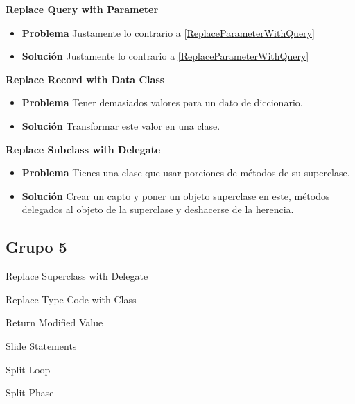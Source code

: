 \documentclass[11pt,a4paper,oneside]{book}
\begin{document}
\textbf{Replace Query with Parameter}
\label{replaceQueryWithParameter}
\begin{itemize}
    \item \textbf{Problema} Justamente lo contrario a \ref{ReplaceParameterWithQuery}
    
    
    \item \textbf{Solución} Justamente lo contrario a \ref{ReplaceParameterWithQuery}
    
\end{itemize}

\textbf{Replace Record with Data Class}
\label{ReplaceRecordWithDataClass}
\begin{itemize}
    \item \textbf{Problema} Tener demasiados valores para un dato de diccionario.
    
    
    \item \textbf{Solución} Transformar este valor en una clase.
    
\end{itemize}

\textbf{Replace Subclass with Delegate}
\label{ReplaceSubclassWithDelegate}
\begin{itemize}
    \item \textbf{Problema} Tienes una clase que usar porciones de métodos de su superclase.
    
    
    \item \textbf{Solución} Crear un capto y poner un objeto superclase en este, métodos delegados al objeto de la superclase y deshacerse de la herencia.
    
\end{itemize}


\subsection{Grupo 5}
Replace Superclass with Delegate

Replace Type Code with Class

Return Modified Value

Slide Statements

Split Loop

Split Phase
\end{document}
